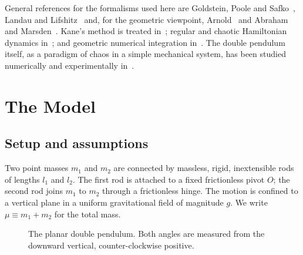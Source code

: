 \documentclass[11pt,a4paper]{book}
\theoremstyle{definition}
\theoremstyle{remark}
\begin{document}
General references for the formalisms used here are Goldstein, Poole and Safko~\cite{goldstein}, Landau and
Lifshitz~\cite{landau} and, for the geometric viewpoint, Arnold~\cite{arnold} and Abraham and
Marsden~\cite{abrahammarsden}. Kane's method is treated in~\cite{kanelevinson}; regular and chaotic Hamiltonian
dynamics in~\cite{lichtenberg}; and geometric numerical integration in~\cite{ghw,sanzserna,leimkuhler}. The
double pendulum itself, as a paradigm of chaos in a simple mechanical system, has been studied numerically and
experimentally in~\cite{shinbrot,levien,stachowiak}.

\section{The Model}
\label{sec:model}

\subsection{Setup and assumptions}

Two point masses $m_1$ and $m_2$ are connected by massless, rigid, inextensible rods of lengths $l_1$ and $l_2$.
The first rod is attached to a fixed frictionless pivot $O$; the second rod joins $m_1$ to $m_2$ through a
frictionless hinge. The motion is confined to a vertical plane in a uniform gravitational field of
magnitude $g$. We write $\mu \equiv m_1+m_2$ for the total mass.

\begin{figure}[ht]
\centering
{}
\caption{The planar double pendulum. Both angles are measured from the downward vertical, counter-clockwise
positive.}
\label{fig:dp}
\end{figure}
\end{document}
